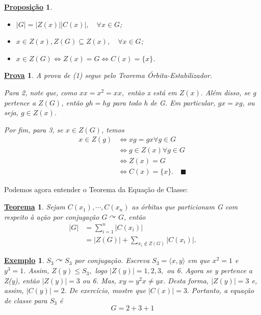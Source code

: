 \documentclass{article}
\newtheorem*{prop*}{\underline{Proposi\c c\~ao}}
\newtheorem*{theorem*}{\underline{Teorema}}
\newtheorem{example*}{\underline{Exemplo}}
\newtheorem*{proof*}{\underline{Prova}}
\renewcommand\qedsymbol{$\blacksquare$}
\begin{document}
\begin{prop*}
 \begin{itemize}
   \item[1)] \(|G| = |Z(x)||C(x)|,\quad \forall x\in G\);
   \item[2)] \(x\in Z(x), Z(G)\subseteq{Z(x)}, \quad \forall x\in G\);
   \item[3)] \(x\in Z(G) \Longleftrightarrow Z(x) = G \Longleftrightarrow C(x) = \{x\}\).
 \end{itemize}
\end{prop*}
\begin{proof*}
  A prova de (1) segue pelo Teorema Órbita-Estabilizador.

  Para 2, note que, como \(xx = x^{2} = xx,\) então x está em \(Z(x).\) Além disso,
se g pertence a \(Z(G)\), então \(gh = hg\) para todo h de G. Em particular, \(gx = xg\),
ou seja, \(g\in Z(x)\).

  Por fim, para 3, se \(x\in Z(G)\), temos 
 \begin{align*}
   x\in Z(g) &\Longleftrightarrow xg=gx \forall g\in G\\
             &\Longleftrightarrow g\in Z(x) \forall g\in G\\
             &\Longleftrightarrow Z(x) = G\\
             &\Longleftrightarrow C(x) = \{x\}.\quad\text{\qedsymbol}
 \end{align*}
\end{proof*}
  Podemos agora entender o Teorema da Equa\c cão de Classe:
  \hypertarget{class_eqn}{
 \begin{theorem*}
   Sejam \(C(x_{1}), \cdots, C(x_{n})\) as órbitas que particionam G com respeito
  à a\c cão por conjuga\c cão \(G \curvearrowright G\), então 
 \begin{align*}
   |G| &= \sum\limits_{i=1}^{n}|C(x_{i})|\\
       &= |Z(G)| + \sum\limits_{x_{i}\not\in Z(G)}^{}|C(x_{i})|.
 \end{align*}
 \end{theorem*}}
\begin{example*}
  \(S_{3} \curvearrowright S_{3}\) por conjuga\c cão. Escreva \(S_{3} = \langle x, y \rangle\)
em que \(x^{2} = 1\) e \(y^{3}=1.\) Assim, \(Z(y)\leq S_{3},\) logo \(|Z(y)| = 1, 2, 3,\) ou 6.
Agora se y pertence a Z(y), então \(|Z(y)| = 3\) ou 6. Mas, \(xy=y^{2}x\neq yx.\) Desta forma,
 \(|Z(y)|=3\) e, assim, \(|C(y)|=2.\) De exercício, mostre que \(|C(x)| = 3.\)
 Portanto, a equa\c cão de classe para \(S_{3}\) é 
   \[
     G = 2 + 3 + 1
   \]
\end{example*}
\end{document}
